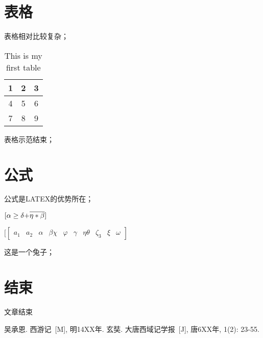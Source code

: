 \documentclass[UTF8,a4paper,10pt]{article}
\begin{document}
\section{表格}
表格相对比较复杂；\newpage
\vspace{3ex}
\begin{table}[htbp]%
  \centering%
  \caption{This is my first table}\label{table}%
  \begin{tabular}{|c|c|c|}
  \hline
  1 & 2 & 3 \\
  \hline
  4 & 5 & 6 \\
  \hline
  7 & 8 & 9 \\
  \hline
\end{tabular}
\end{table}
\vspace{3ex}
\indent 表格示范结束；\par

\section{公式}
公式是LATEX的优势所在； \par
\indent 
\begin{minipage}[h]{0.48\linewidth}
$[\alpha \ge \delta {\rm{ + }}\overline {\eta * \beta } ]$
\end{minipage}\par
\begin{minipage}[h]{0.48\linewidth}
$[\left[ {\begin{array}
{*{20}{c}}{{a_1}}&{{a_2}}&\alpha &\beta \chi &\varphi &\gamma &\eta \theta &{{\zeta _3}}&\xi &\omega
\end{array}}
\right]$
\end{minipage}
\vspace{3ex}\par
\indent 这是一个兔子；

\section{结束}
 文章结束
\newpage
\small
\begin{thebibliography}{99}
\setlength{\parskip}{0pt} %
吴承恩. 西游记~[M], 明14XX年.
 玄奘. 大唐西域记学报~[J], 唐6XX年, 1(2): 23-55.
\end{thebibliography}
\clearpage
\end{document}
